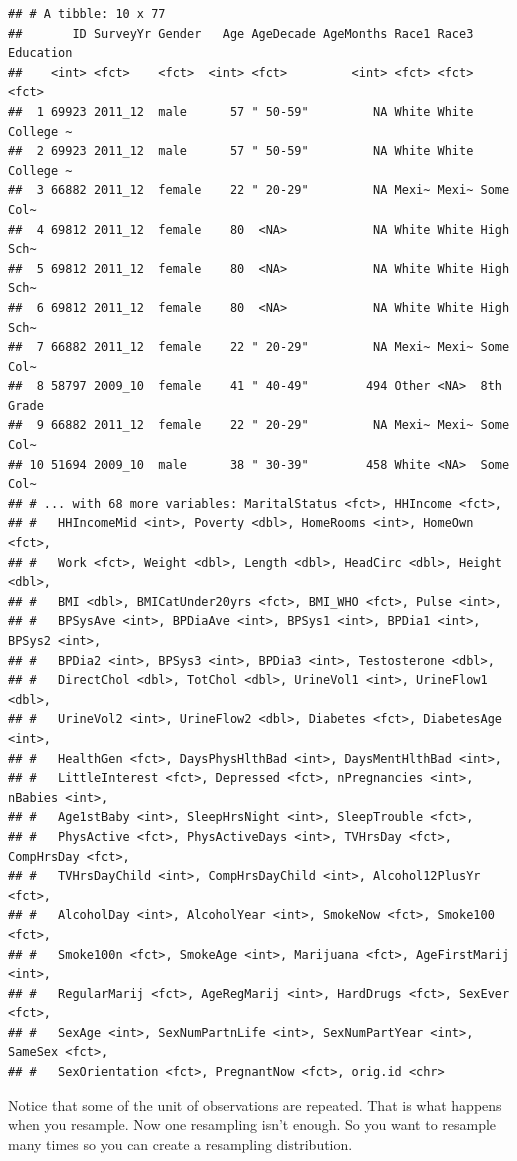 \documentclass[
]{book}
\begin{document}
\begin{verbatim}
## # A tibble: 10 x 77
##       ID SurveyYr Gender   Age AgeDecade AgeMonths Race1 Race3 Education
##    <int> <fct>    <fct>  <int> <fct>         <int> <fct> <fct> <fct>    
##  1 69923 2011_12  male      57 " 50-59"         NA White White College ~
##  2 69923 2011_12  male      57 " 50-59"         NA White White College ~
##  3 66882 2011_12  female    22 " 20-29"         NA Mexi~ Mexi~ Some Col~
##  4 69812 2011_12  female    80  <NA>            NA White White High Sch~
##  5 69812 2011_12  female    80  <NA>            NA White White High Sch~
##  6 69812 2011_12  female    80  <NA>            NA White White High Sch~
##  7 66882 2011_12  female    22 " 20-29"         NA Mexi~ Mexi~ Some Col~
##  8 58797 2009_10  female    41 " 40-49"        494 Other <NA>  8th Grade
##  9 66882 2011_12  female    22 " 20-29"         NA Mexi~ Mexi~ Some Col~
## 10 51694 2009_10  male      38 " 30-39"        458 White <NA>  Some Col~
## # ... with 68 more variables: MaritalStatus <fct>, HHIncome <fct>,
## #   HHIncomeMid <int>, Poverty <dbl>, HomeRooms <int>, HomeOwn <fct>,
## #   Work <fct>, Weight <dbl>, Length <dbl>, HeadCirc <dbl>, Height <dbl>,
## #   BMI <dbl>, BMICatUnder20yrs <fct>, BMI_WHO <fct>, Pulse <int>,
## #   BPSysAve <int>, BPDiaAve <int>, BPSys1 <int>, BPDia1 <int>, BPSys2 <int>,
## #   BPDia2 <int>, BPSys3 <int>, BPDia3 <int>, Testosterone <dbl>,
## #   DirectChol <dbl>, TotChol <dbl>, UrineVol1 <int>, UrineFlow1 <dbl>,
## #   UrineVol2 <int>, UrineFlow2 <dbl>, Diabetes <fct>, DiabetesAge <int>,
## #   HealthGen <fct>, DaysPhysHlthBad <int>, DaysMentHlthBad <int>,
## #   LittleInterest <fct>, Depressed <fct>, nPregnancies <int>, nBabies <int>,
## #   Age1stBaby <int>, SleepHrsNight <int>, SleepTrouble <fct>,
## #   PhysActive <fct>, PhysActiveDays <int>, TVHrsDay <fct>, CompHrsDay <fct>,
## #   TVHrsDayChild <int>, CompHrsDayChild <int>, Alcohol12PlusYr <fct>,
## #   AlcoholDay <int>, AlcoholYear <int>, SmokeNow <fct>, Smoke100 <fct>,
## #   Smoke100n <fct>, SmokeAge <int>, Marijuana <fct>, AgeFirstMarij <int>,
## #   RegularMarij <fct>, AgeRegMarij <int>, HardDrugs <fct>, SexEver <fct>,
## #   SexAge <int>, SexNumPartnLife <int>, SexNumPartYear <int>, SameSex <fct>,
## #   SexOrientation <fct>, PregnantNow <fct>, orig.id <chr>
\end{verbatim}



Notice that some of the unit of observations are repeated. That is what happens when you resample. Now one resampling isn't enough. So you want to resample many times so you can create a resampling distribution.
\end{document}
